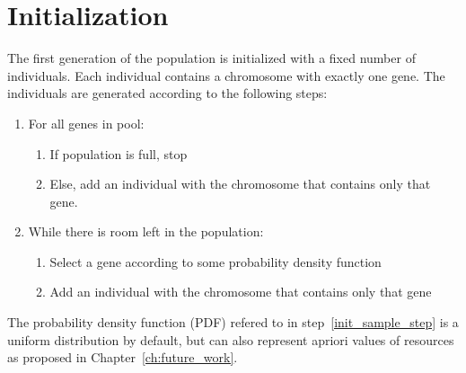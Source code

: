 \section{Initialization}
\label{sec:approach_initialization}
The first generation of the population is initialized with a fixed number of
individuals. Each individual contains a chromosome with exactly one gene. The
individuals are generated according to the following steps:
\begin{enumerate}
	\item For all genes in pool:
		\begin{enumerate}
			\item If population is full, stop
			\item Else, add an individual with the chromosome that contains only that gene.
		\end{enumerate}
	\item While there is room left in the population:
		\begin{enumerate}
			\item \label{init_sample_step}Select a gene according to some probability density function
			\item Add an individual with the chromosome that contains only that
				gene
		\end{enumerate}
\end{enumerate}
The probability density function (PDF) refered to in
step~\ref{init_sample_step} is a uniform distribution by default, but can also
represent apriori values of resources as proposed in
Chapter~\ref{ch:future_work}.
